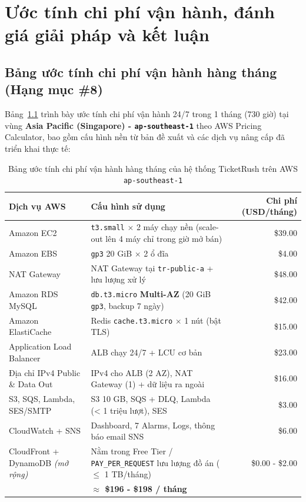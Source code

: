\chapter[Chi phí, đánh giá và kết luận]{Ước tính chi phí vận hành, đánh giá giải pháp và kết luận}

\section{Bảng ước tính chi phí vận hành hàng tháng (Hạng mục \#8)}
Bảng~\ref{tab:cost-estimate} trình bày ước tính chi phí vận hành 24/7 trong 1 tháng (730 giờ) tại vùng \textbf{Asia Pacific (Singapore) - \texttt{ap-southeast-1}} theo AWS Pricing Calculator, bao gồm cấu hình nền từ bản đề xuất và các dịch vụ nâng cấp đã triển khai thực tế:

\begin{table}[H]
  \centering
  \footnotesize
  \renewcommand{\arraystretch}{1.18}
  \begin{tabularx}{\textwidth}{>{\raggedright\arraybackslash}p{4.3cm} >{\raggedright\arraybackslash}X r}
    \toprule
    \textbf{Dịch vụ AWS} & \textbf{Cấu hình sử dụng} & \textbf{Chi phí (USD/tháng)} \\
    \midrule
    Amazon EC2 & \texttt{t3.small} $\times$ 2 máy chạy nền (scale-out lên 4 máy chỉ trong giờ mở bán) & \$39.00 \\
    Amazon EBS & \texttt{gp3} 20 GiB $\times$ 2 ổ đĩa & \$4.00 \\
    NAT Gateway & 1 NAT Gateway tại \texttt{tr-public-a} + lưu lượng xử lý & \$48.00 \\
    Amazon RDS MySQL & \texttt{db.t3.micro} \textbf{Multi-AZ} (20 GiB \texttt{gp3}, backup 7 ngày) & \$42.00 \\
    Amazon ElastiCache & Redis \texttt{cache.t3.micro} $\times$ 1 nút (bật TLS) & \$15.00 \\
    Application Load Balancer & 1 ALB chạy 24/7 + LCU cơ bản & \$23.00 \\
    Địa chỉ IPv4 Public \& Data Out & IPv4 cho ALB (2 AZ), NAT Gateway (1) + dữ liệu ra ngoài & \$16.00 \\
    S3, SQS, Lambda, SES/SMTP & S3 10 GB, SQS + DLQ, Lambda (< 1 triệu lượt), SES & \$3.00 \\
    CloudWatch + SNS & Dashboard, 7 Alarms, Logs, thông báo email SNS & \$6.00 \\
    CloudFront + DynamoDB \textit{(mở rộng)} & Nằm trong Free Tier / \texttt{PAY\_PER\_REQUEST} lưu lượng đồ án ($\le$ 1 TB/tháng) & \$0.00 - \$2.00 \\
    \midrule
    \multicolumn{2}{r}{\textbf{Tổng chi phí ước tính vận hành 24/7}} & \textbf{$\approx$ \$196 - \$198 / tháng} \\
    \bottomrule
  \end{tabularx}
  \caption{Bảng ước tính chi phí vận hành hàng tháng của hệ thống TicketRush trên AWS \texttt{ap-southeast-1}}
  \label{tab:cost-estimate}
\end{table}

